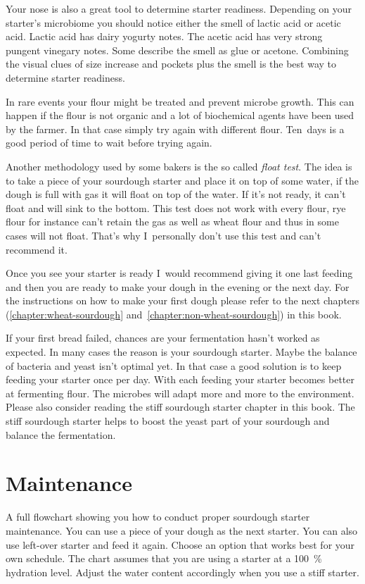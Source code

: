 Your nose is also
a great tool to determine starter readiness. Depending on
your starter's microbiome you should notice either the smell
of lactic acid or acetic acid. Lactic acid has dairy yogurty notes.
The acetic acid has very strong pungent vinegary notes. Some
describe the smell as glue or acetone. Combining the visual clues
of size increase and pockets plus the smell is the best way
to determine starter readiness.

In rare events your flour might be treated and prevent microbe growth.
This can happen if the flour is not organic and a lot of biochemical
agents have been used by the farmer. In that case simply try again
with different flour. Ten~days is a good period of time to wait before
trying again.

Another methodology used by some bakers is the so called \emph{float test}.
The idea is to take a piece of your sourdough starter and place it
on top of some water, if the dough is full with gas it will float
on top of the water. If it's not ready, it can't float and will
sink to the bottom. This test does not work with every flour,
rye flour for instance can't retain the gas as well as wheat flour
and thus in some cases will not float. That's why I~personally
don't use this test and can't recommend it.

Once you see your starter is ready I~would recommend giving it
one last feeding and then you are ready to make your dough in the
evening or the next day. For the instructions on how to make your
first dough please refer to the next chapters (\ref{chapter:wheat-sourdough}
and~\ref{chapter:non-wheat-sourdough}) in this book.

If your first bread failed, chances are your fermentation hasn't
worked as expected. In many cases the reason is your sourdough starter. Maybe
the balance of bacteria and yeast isn't optimal yet. In that case a good
solution is to keep feeding your starter once per day. With each feeding your
starter becomes better at fermenting flour. The microbes will adapt more and
more to the environment. Please also consider reading the stiff sourdough starter
chapter in this book. The stiff sourdough starter helps to boost the
yeast part of your sourdough and balance the fermentation.

\section{Maintenance}

\begin{flowchart}[!htb]
\centering
  
  \caption[Sourdough starter maintenance flowchart]{A full flowchart showing
      you how to conduct proper sourdough starter maintenance. You can use a
      piece of your dough as the next starter. You can also use left-over
      starter and feed it again. Choose an option that works best for your own
      schedule. The chart assumes that you are using a starter at a
      \qty{100}{\percent} hydration level. Adjust the water content
      accordingly when you use a stiff starter.}%
  \label{fig:sourdough-maintenance-process}
\end{flowchart}

